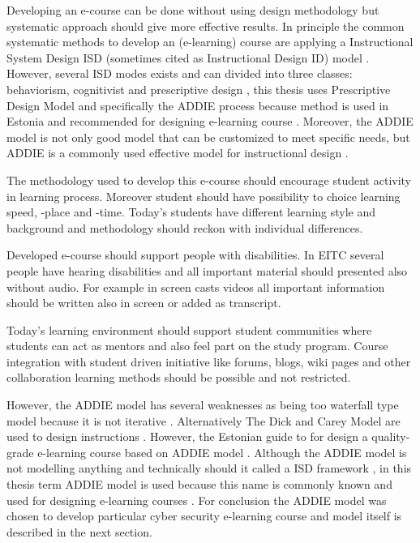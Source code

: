 Developing an e-course can be done without using design methodology but systematic approach should give more effective results. In principle the common systematic methods to develop an (e-learning) course are applying a Instructional System Design \gls{ISD} (sometimes cited as  Instructional Design \gls{ID}) model \citep{website:id_models}. However, several \gls{ISD} modes exists and can divided into three classes: behaviorism, cognitivist and prescriptive design \citep{website:id_models}, this thesis uses Prescriptive Design Model and specifically the \gls{ADDIE} process because method is used in Estonia and recommended for designing e-learning course \citep[p.~5]{OppeArenduskeskus2010}. Moreover, the \gls{ADDIE} model is not only good model that can be customized to meet specific needs, but ADDIE is a commonly used effective model for instructional  design \citep{ieee_addie_1607206}.

The methodology used to develop this e-course should encourage student activity in learning process. Moreover student should have possibility to choice learning speed, -place and -time. Today's students have different learning style and background and methodology should reckon with individual differences.

Developed e-course should support people with disabilities. In \gls{EITC} several people have hearing disabilities and all important material should presented also without audio. For example in screen casts videos all important information should be written also in screen or added as transcript.

Today’s learning environment should support student communities where students can act as mentors and also feel part on the study program. Course integration with student driven initiative like forums, blogs, wiki pages and other collaboration learning methods should be possible and not restricted.

 However, the \gls{ADDIE} model has several weaknesses as being too waterfall type model because it is not iterative \citep{website:weakesses_of_ADDIE_model}. Alternatively The Dick and Carey Model are used to design instructions \citep{dick2005systematic}. However, the Estonian guide to for design a quality-grade e-learning course based on \gls{ADDIE} model \citep{OppeArenduskeskus2010}. Although the ADDIE model is not modelling anything and technically should it called a \gls{ISD} framework \citep{bichelmeyer2004addie}, in this thesis term ADDIE model is used because this name is commonly known and used for designing e-learning courses \citep{bichelmeyer2004addie, OppeArenduskeskus2010}.
For conclusion the \gls{ADDIE} model was chosen to develop particular cyber security e-learning course and model itself is described in the next section.

